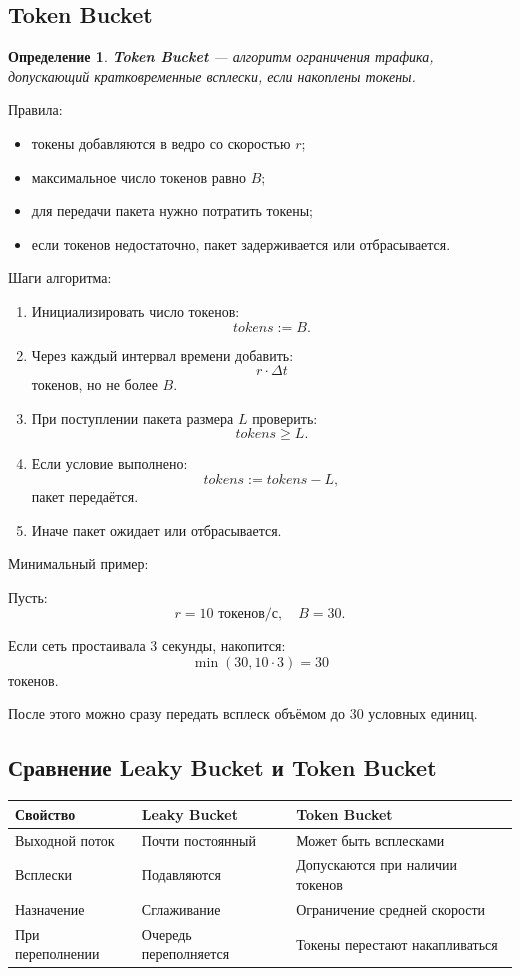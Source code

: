 \documentclass[12pt,a4paper]{article}
\newtheorem{definition}{Определение}
\begin{document}
\subsection{Token Bucket}

\begin{definition}
\textbf{Token Bucket} --- алгоритм ограничения трафика, допускающий кратковременные всплески, если накоплены токены.
\end{definition}

Правила:
\begin{itemize}
    \item токены добавляются в ведро со скоростью $r$;
    \item максимальное число токенов равно $B$;
    \item для передачи пакета нужно потратить токены;
    \item если токенов недостаточно, пакет задерживается или отбрасывается.
\end{itemize}

Шаги алгоритма:
\begin{enumerate}
    \item Инициализировать число токенов:
    \[
    tokens := B.
    \]
    \item Через каждый интервал времени добавить:
    \[
    r \cdot \Delta t
    \]
    токенов, но не более $B$.
    \item При поступлении пакета размера $L$ проверить:
    \[
    tokens \geq L.
    \]
    \item Если условие выполнено:
    \[
    tokens := tokens - L,
    \]
    пакет передаётся.
    \item Иначе пакет ожидает или отбрасывается.
\end{enumerate}

Минимальный пример:

Пусть:
\[
r=10 \text{ токенов/с},\quad B=30.
\]

Если сеть простаивала 3 секунды, накопится:
\[
\min(30, 10 \cdot 3)=30
\]
токенов.

После этого можно сразу передать всплеск объёмом до 30 условных единиц.

\subsection{Сравнение Leaky Bucket и Token Bucket}

\begin{center}
\begin{tabular}{|p{}|p{}|p{}|}
\hline
\textbf{Свойство} & \textbf{Leaky Bucket} & \textbf{Token Bucket} \\
\hline
Выходной поток & Почти постоянный & Может быть всплесками \\
\hline
Всплески & Подавляются & Допускаются при наличии токенов \\
\hline
Назначение & Сглаживание & Ограничение средней скорости \\
\hline
При переполнении & Очередь переполняется & Токены перестают накапливаться \\
\hline
\end{tabular}
\end{center}
\end{document}

